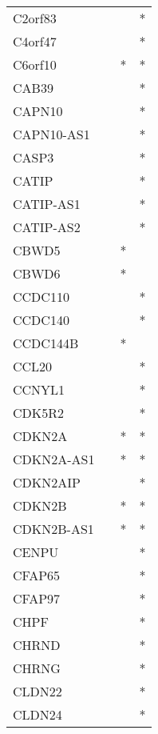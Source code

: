 \begin{longtable}{lccc}
C2orf83        &           &     &       * \\
C4orf47        &           &     &       * \\
C6orf10        &           &   * &       * \\
CAB39          &           &     &       * \\
CAPN10         &           &     &       * \\
CAPN10-AS1     &           &     &       * \\
CASP3          &           &     &       * \\
CATIP          &           &     &       * \\
CATIP-AS1      &           &     &       * \\
CATIP-AS2      &           &     &       * \\
CBWD5          &           &   * &         \\
CBWD6          &           &   * &         \\
CCDC110        &           &     &       * \\
CCDC140        &           &     &       * \\
CCDC144B       &           &   * &         \\
CCL20          &           &     &       * \\
CCNYL1         &           &     &       * \\
CDK5R2         &           &     &       * \\
CDKN2A         &           &   * &       * \\
CDKN2A-AS1     &           &   * &       * \\
CDKN2AIP       &           &     &       * \\
CDKN2B         &           &   * &       * \\
CDKN2B-AS1     &           &   * &       * \\
CENPU          &           &     &       * \\
CFAP65         &           &     &       * \\
CFAP97         &           &     &       * \\
CHPF           &           &     &       * \\
CHRND          &           &     &       * \\
CHRNG          &           &     &       * \\
CLDN22         &           &     &       * \\
CLDN24         &           &     &       * \\

\end{longtable}
